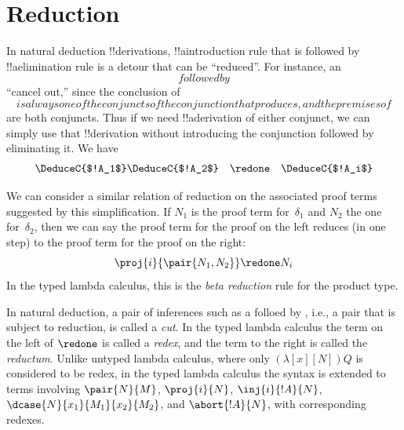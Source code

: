 \documentclass[10pt,a4paper]{article}
\theoremstyle{plain}
\theoremstyle{definition}
\theoremstyle{remark}
\newcommand*{\olfileid}[3]{}
\newcommand*{\olsection}[1]{\section*{#1}}
\newcommand*{\olimport}[1]{}
\providecommand{\AxiomC}[1]{}
\providecommand{\UnaryInfC}[1]{}
\providecommand{\BinaryInfC}[1]{}
\providecommand{\RightLabel}[1]{}
\providecommand{\DisplayProof}{}
\providecommand{\lambd}{\ensuremath{\lambda}}
\providecommand{\Elim}[1]{}
\providecommand{\Intro}[1]{}
\providecommand{\Intro}{\mathrm{I}}
\providecommand{\bottomAlignProof}{\relax}
\providecommand{\bottomAlignProof}{\relax}
\begin{document}
\olimport{introduction}
\olimport{proof-terms}
\olimport{proofs-to-terms}
\olimport{terms-to-proofs}
\olimport{types}
\olimport{reduction}
\olimport{type-preservation}
\olimport{normalization}

\OLEndChapterHook





\olfileid{int}{pty}{red}

\olsection{Reduction}

In natural deduction !!{derivation}s, !!a{introduction} rule that is
followed by !!a{elimination} rule is a detour that can be ``reduced''.
For instance, an $\Intro{\land}$ followed by $\Elim{\land}$ ``cancel
out,'' since the conclusion of $\Elim{\land}$ is always one of the
conjuncts of the conjunction that \Intro{\land} produces, and the
premises of $\Intro{\land}$ are both conjuncts. Thus if we need
!!a{derivation} of either conjunct, we can simply use that
!!{derivation} without introducing the conjunction followed by
eliminating it. We have
\begin{gather*}
  \bottomAlignProof
  \AxiomC{}
  \RightLabel{$\delta_1$}
  \DeduceC{$!A_1$}
  \AxiomC{}
  \RightLabel{$\delta_2$}
  \DeduceC{$!A_2$}
  \RightLabel{$\Intro{\land}$}
  \BinaryInfC{$!A_1 \land !A_2$}
  \RightLabel{$\Elim{\land}_i$}
  \UnaryInfC{$!A_i$}
  \DisplayProof\bottomAlignProof
  \quad
  \redone
  \quad
  \AxiomC{}
  \RightLabel{$\delta_i$}
  \DeduceC{$!A_i$}
  \DisplayProof
\end{gather*}

We can consider a similar relation of reduction on the associated
proof terms suggested by this simplification. If $N_1$ is the proof
term for~$\delta_1$ and $N_2$ the one for~$\delta_2$, then we can say
the proof term for the proof on the left reduces (in one step) to the
proof term for the proof on the right:
\[
  \proj{i}{\pair{N_1, N_2}} \redone N_i
\]
In the typed lambda calculus, this is the \emph{beta reduction} rule for
the product type.

In natural deduction, a pair of inferences such as a \Intro{\land}
folloed by \Elim{\land}, i.e., a pair that is subject to reduction, is
called a \emph{cut}. In the typed lambda calculus the term on the left
of $\redone$ is called a \emph{redex}, and the term to the right is
called the \emph{reductum}. Unlike untyped lambda calculus, where only
$(\lambd[x][N])Q$ is considered to be redex, in the typed lambda
calculus the syntax is extended to terms involving $\pair{N}{M}$,
$\proj{i}{N}$, $\inj{i}{!A}{N}$, $\dcase{N}{x_1}{M_1}{x_2}{M_2}$, and
$\abort{!A}{N}$, with corresponding redexes.
\end{document}
